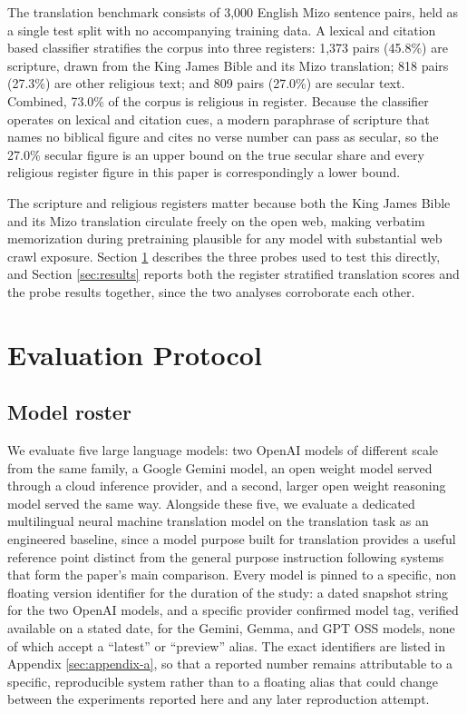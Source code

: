 \documentclass[11pt,a4paper]{article}
\begin{document}
The translation benchmark consists of 3,000 English Mizo sentence pairs, held as a single test split with no accompanying training data. A lexical and citation based classifier stratifies the corpus into three registers: 1,373 pairs (45.8\%) are scripture, drawn from the King James Bible and its Mizo translation; 818 pairs (27.3\%) are other religious text; and 809 pairs (27.0\%) are secular text. Combined, 73.0\% of the corpus is religious in register. Because the classifier operates on lexical and citation cues, a modern paraphrase of scripture that names no biblical figure and cites no verse number can pass as secular, so the 27.0\% secular figure is an upper bound on the true secular share and every religious register figure in this paper is correspondingly a lower bound.

The scripture and religious registers matter because both the King James Bible and its Mizo translation circulate freely on the open web, making verbatim memorization during pretraining plausible for any model with substantial web crawl exposure. Section \ref{sec:protocol} describes the three probes used to test this directly, and Section \ref{sec:results} reports both the register stratified translation scores and the probe results together, since the two analyses corroborate each other.

\section{Evaluation Protocol}
\label{sec:protocol}

\subsection{Model roster}

We evaluate five large language models: two OpenAI models of different scale from the same family, a Google Gemini model, an open weight model served through a cloud inference provider, and a second, larger open weight reasoning model served the same way. Alongside these five, we evaluate a dedicated multilingual neural machine translation model on the translation task as an engineered baseline, since a model purpose built for translation provides a useful reference point distinct from the general purpose instruction following systems that form the paper's main comparison. Every model is pinned to a specific, non floating version identifier for the duration of the study: a dated snapshot string for the two OpenAI models, and a specific provider confirmed model tag, verified available on a stated date, for the Gemini, Gemma, and GPT OSS models, none of which accept a ``latest'' or ``preview'' alias. The exact identifiers are listed in Appendix \ref{sec:appendix-a}, so that a reported number remains attributable to a specific, reproducible system rather than to a floating alias that could change between the experiments reported here and any later reproduction attempt.
\end{document}

